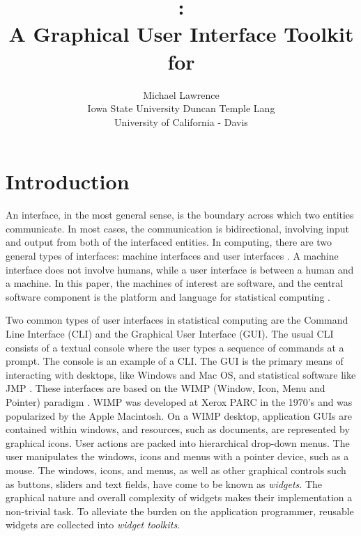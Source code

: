 \documentclass[article]{jss}
\author{Michael Lawrence\\
Iowa State University \And Duncan Temple Lang\\
University of California - Davis}
\title{\pkg{RGtk2}:\\A Graphical User Interface Toolkit for \proglang{R}}
\begin{document}
\section{Introduction}


An interface, in the most general sense, is the boundary across which two
entities communicate. In most cases, the communication is bidirectional, 
involving input and output from both of the interfaced entities. In computing,
there are two general types of interfaces: machine interfaces and user interfaces
\citep{gui-cli}. A machine interface does not involve humans, while a 
user interface is between a human and a machine. In this paper, the machines of
interest are software, and the central software component is the  
platform and language for statistical computing \citep{R}.

Two common types of user interfaces in statistical computing are the Command
Line Interface (CLI) and the Graphical User Interface (GUI). The usual CLI 
consists of a textual console where the user types a sequence of commands
at a prompt. The  console is an example of a CLI. The GUI is the primary
means of interacting with desktops, like Windows and Mac OS, and
statistical software like JMP \citep{JMP}. These
interfaces are based on the WIMP (Window, Icon, Menu and Pointer) paradigm 
\citep{WIMP}. WIMP was developed at Xerox PARC in the 1970's and was popularized by 
the Apple Macintosh. On a WIMP desktop, application GUIs are contained within 
windows, and resources, such as documents, are represented by graphical icons. 
User actions are packed into hierarchical drop-down menus. The user manipulates
the windows, icons and menus with a pointer device, such as a mouse. The windows,
icons, and menus, as well as other graphical controls such as buttons, sliders and 
text fields, have come to be known as \emph{widgets}. The graphical nature and 
overall complexity of widgets makes their implementation a non-trivial task. 
To alleviate the burden on the application
programmer, reusable widgets are collected into \emph{widget toolkits}.
\end{document}
